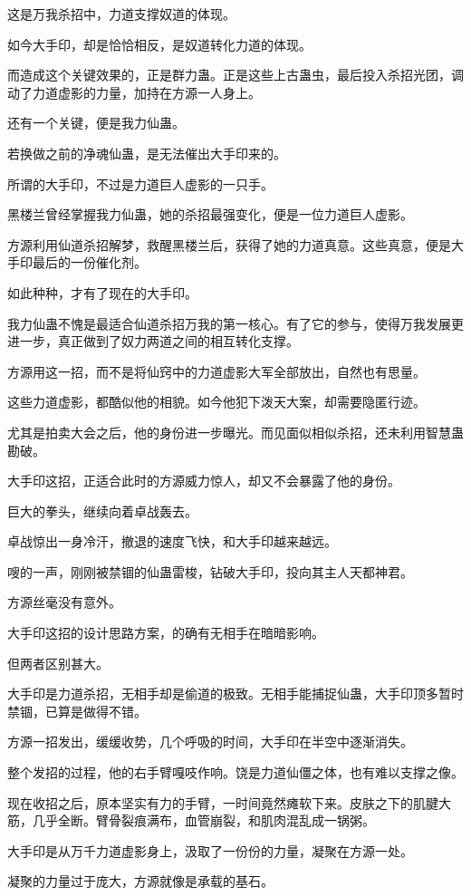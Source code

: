 \begin{this_body}
这是万我杀招中，力道支撑奴道的体现。

如今大手印，却是恰恰相反，是奴道转化力道的体现。

而造成这个关键效果的，正是群力蛊。正是这些上古蛊虫，最后投入杀招光团，调动了力道虚影的力量，加持在方源一人身上。

还有一个关键，便是我力仙蛊。

若换做之前的净魂仙蛊，是无法催出大手印来的。

所谓的大手印，不过是力道巨人虚影的一只手。

黑楼兰曾经掌握我力仙蛊，她的杀招最强变化，便是一位力道巨人虚影。

方源利用仙道杀招解梦，救醒黑楼兰后，获得了她的力道真意。这些真意，便是大手印最后的一份催化剂。

如此种种，才有了现在的大手印。

我力仙蛊不愧是最适合仙道杀招万我的第一核心。有了它的参与，使得万我发展更进一步，真正做到了奴力两道之间的相互转化支撑。

方源用这一招，而不是将仙窍中的力道虚影大军全部放出，自然也有思量。

这些力道虚影，都酷似他的相貌。如今他犯下泼天大案，却需要隐匿行迹。

尤其是拍卖大会之后，他的身份进一步曝光。而见面似相似杀招，还未利用智慧蛊勘破。

大手印这招，正适合此时的方源威力惊人，却又不会暴露了他的身份。

巨大的拳头，继续向着卓战轰去。

卓战惊出一身冷汗，撤退的速度飞快，和大手印越来越远。

嗖的一声，刚刚被禁锢的仙蛊雷梭，钻破大手印，投向其主人天都神君。

方源丝毫没有意外。

大手印这招的设计思路方案，的确有无相手在暗暗影响。

但两者区别甚大。

大手印是力道杀招，无相手却是偷道的极致。无相手能捕捉仙蛊，大手印顶多暂时禁锢，已算是做得不错。

方源一招发出，缓缓收势，几个呼吸的时间，大手印在半空中逐渐消失。

整个发招的过程，他的右手臂嘎吱作响。饶是力道仙僵之体，也有难以支撑之像。

现在收招之后，原本坚实有力的手臂，一时间竟然瘫软下来。皮肤之下的肌腱大筋，几乎全断。臂骨裂痕满布，血管崩裂，和肌肉混乱成一锅粥。

大手印是从万千力道虚影身上，汲取了一份份的力量，凝聚在方源一处。

凝聚的力量过于庞大，方源就像是承载的基石。


\end{this_body}
